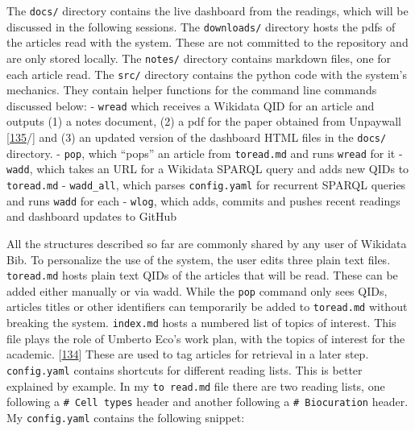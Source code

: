 The \texttt{docs/} directory contains the live dashboard from the readings, which will be discussed in the following sessions.
The \texttt{downloads/} directory hosts the pdfs of the articles read with the system.
These are not committed to the repository and are only stored locally.
The \texttt{notes/} directory contains markdown files, one for each article read.
The \texttt{src/} directory contains the python code with the system's mechanics.
They contain helper functions for the command line commands discussed below:
- \texttt{wread} which receives a Wikidata QID for an article and outputs (1) a notes document, (2) a pdf for the paper obtained from Unpaywall {[}\protect\hyperlink{ref-15luL9zZC}{135}/{]} and (3) an updated version of the dashboard HTML files in the \texttt{docs/} directory.
- \texttt{pop}, which ``pops'' an article from \texttt{toread.md} and runs \texttt{wread} for it
- \texttt{wadd}, which takes an URL for a Wikidata SPARQL query and adds new QIDs to \texttt{toread.md}
- \texttt{wadd\_all}, which parses \texttt{config.yaml} for recurrent SPARQL queries and runs \texttt{wadd} for each
- \texttt{wlog}, which adds, commits and pushes recent readings and dashboard updates to GitHub

All the structures described so far are commonly shared by any user of Wikidata Bib.
To personalize the use of the system, the user edits three plain text files.
\texttt{toread.md} hosts plain text QIDs of the articles that will be read.
These can be added either manually or via wadd.
While the \texttt{pop} command only sees QIDs, articles titles or other identifiers can temporarily be added to \texttt{toread.md} without breaking the system.
\texttt{index.md} hosts a numbered list of topics of interest.
This file plays the role of Umberto Eco's work plan, with the topics of interest for the academic. {[}\protect\hyperlink{ref-1HBVPtZGp}{134}{]}
These are used to tag articles for retrieval in a later step.
\texttt{config.yaml} contains shortcuts for different reading lists.
This is better explained by example.
In my \texttt{to\ read.md} file there are two reading lists, one following a \texttt{\#\ Cell\ types} header and another following a \texttt{\#\ Biocuration} header.
My \texttt{config.yaml} contains the following snippet:

\begin{Shaded}
\begin{Highlighting}[]
\KeywordTok{:}
\AttributeTok{  }\KeywordTok{:}
\AttributeTok{  }\KeywordTok{:}
\end{Highlighting}
\end{Shaded}

